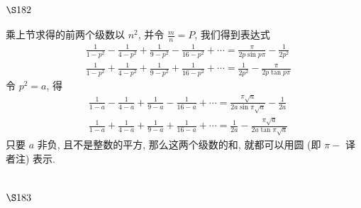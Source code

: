 \section{$\S 182$}

乘上节求得的前两个级数以 $n^{2}$, 并令 $\frac{m}{n}=P$, 我们得到表达式
\[
\begin{aligned}
& \frac{1}{1-p^{2}}-\frac{1}{4-p^{2}}+\frac{1}{9-p^{2}}-\frac{1}{16-p^{2}}+\cdots=\frac{\pi}{2 p \sin p \pi}-\frac{1}{2 p^{2}} \\
& \frac{1}{1-p^{2}}+\frac{1}{4-p^{2}}+\frac{1}{9-p^{2}}+\frac{1}{16-p^{2}}+\cdots=\frac{1}{2 p^{2}}-\frac{\pi}{2 p \tan p \pi}
\end{aligned}
\]
令 $p^{2}=a$, 得
\[
\begin{aligned}
& \frac{1}{1-a}-\frac{1}{4-a}+\frac{1}{9-a}-\frac{1}{16-a}+\cdots=\frac{\pi \sqrt{a}}{2 a \sin \pi \sqrt{a}}-\frac{1}{2 a} \\
& \frac{1}{1-a}+\frac{1}{4-a}+\frac{1}{9-a}+\frac{1}{16-a}+\cdots=\frac{1}{2 a}-\frac{\pi \sqrt{a}}{2 a \tan \pi \sqrt{a}}
\end{aligned}
\]
只要 $a$ 非负, 且不是整数的平方, 那么这两个级数的和, 就都可以用圆 (即 $\pi-$ 译者注) 表示.

\section{$\S 183$}

